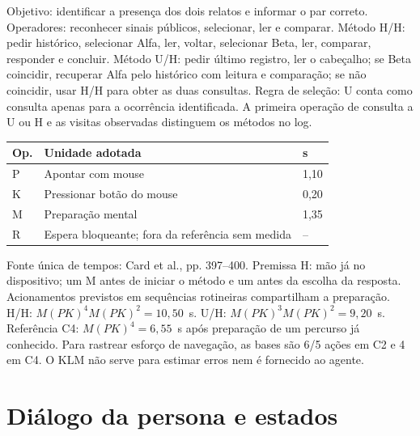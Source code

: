  Objetivo: identificar a presença dos dois relatos e informar o par correto. Operadores: reconhecer sinais públicos, selecionar, ler e comparar. Método H/H: pedir histórico, selecionar Alfa, ler, voltar, selecionar Beta, ler, comparar, responder e concluir. Método U/H: pedir último registro, ler o cabeçalho; se Beta coincidir, recuperar Alfa pelo histórico com leitura e comparação; se não coincidir, usar H/H para obter as duas consultas. Regra de seleção: U conta como consulta apenas para a ocorrência identificada. A primeira operação de consulta a U ou H e as visitas observadas distinguem os métodos no log.

\begin{center}\small
\begin{tabularx}{\columnwidth}{@{}lYl@{}}\toprule
Op. & Unidade adotada & s\\\midrule
P & Apontar com mouse & 1,10\\
K & Pressionar botão do mouse & 0,20\\
M & Preparação mental & 1,35\\
R & Espera bloqueante; fora da referência sem medida & --\\\bottomrule
\end{tabularx}
\end{center}

Fonte única de tempos: Card et al., pp. 397--400. Premissa H: mão já no dispositivo; um M antes de iniciar o método e um antes da escolha da resposta. Acionamentos previstos em sequências rotineiras compartilham a preparação. H/H: $M(PK)^4M(PK)^2=10{,}50$~s. U/H: $M(PK)^3M(PK)^2=9{,}20$~s. Referência C4: $M(PK)^4=6{,}55$~s após preparação de um percurso já conhecido. Para rastrear esforço de navegação, as bases são 6/5 ações em C2 e 4 em C4. O KLM não serve para estimar erros nem é fornecido ao agente.

\section{Diálogo da persona e estados}\label{ap:molic}
\begin{center}
\end{center}

